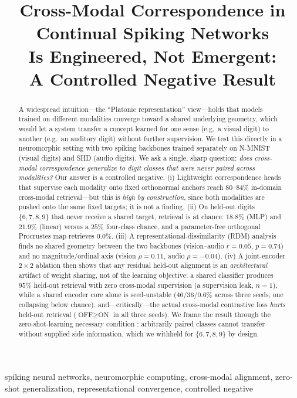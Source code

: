 \documentclass[conference]{IEEEtran}
\title{Cross-Modal Correspondence in Continual Spiking Networks\\
Is Engineered, Not Emergent:\\
A Controlled Negative Result}
\author{
\IEEEauthorblockN{\todo{Author names}}
\IEEEauthorblockA{\todo{Affiliation, email}}
}
\begin{document}
\maketitle

\begin{abstract}
A widespread intuition---the ``Platonic representation'' view---holds that
models trained on different modalities converge toward a shared underlying
geometry, which would let a system transfer a concept learned for one sense
(e.g.\ a visual digit) to another (e.g.\ an auditory digit) without further
supervision. We test this directly in a neuromorphic setting with two
spiking backbones trained separately on N-MNIST (visual digits) and SHD
(audio digits). We ask a single, sharp question: \emph{does cross-modal
correspondence generalize to digit classes that were never paired across
modalities?} Our answer is a controlled negative. (i) Lightweight
correspondence heads that supervise each modality onto fixed orthonormal
anchors reach $80$--$84\%$ in-domain cross-modal retrieval---but this is
\emph{high by construction}, since both modalities are pushed onto the same
fixed targets; it is not a finding. (ii) On held-out digits $\{6,7,8,9\}$
that never receive a shared target, retrieval is at chance: $18.8\%$ (MLP)
and $21.9\%$ (linear) versus a $25\%$ four-class chance, and a
parameter-free orthogonal Procrustes map retrieves $0.0\%$. (iii) A
representational-dissimilarity (RDM) analysis finds no shared geometry
between the two backbones (vision--audio $r=0.05$, $p=0.74$) and no
magnitude/ordinal axis (vision $\rho=0.11$, audio $\rho=-0.04$). (iv) A
joint-encoder $2{\times}2$ ablation then shows that any residual held-out
alignment is an \emph{architectural} artifact of weight sharing, not of the
learning objective: a shared classifier produces $95\%$ held-out retrieval
with zero cross-modal supervision (a supervision leak, $n{=}1$), while a
shared encoder core alone is seed-unstable ($46/36/0.6\%$ across three
seeds, one collapsing below chance), and---critically---the actual
cross-modal contrastive loss \emph{hurts} held-out retrieval
($\text{OFF}\ge\text{ON}$ in all three seeds). We frame the result through
the zero-shot-learning necessary condition \cite{palatucci2009}: arbitrarily
paired classes cannot transfer without supplied side information, which we
withheld for $\{6,7,8,9\}$ by design.
\end{abstract}

\begin{IEEEkeywords}
spiking neural networks, neuromorphic computing, cross-modal alignment,
zero-shot generalization, representational convergence, controlled negative
\end{IEEEkeywords}
\end{document}
